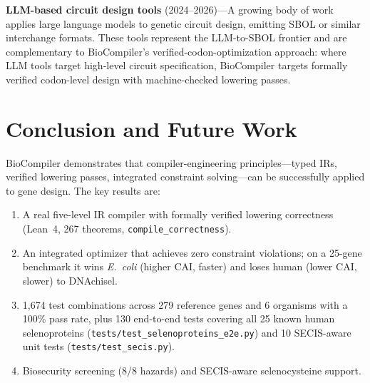\documentclass[11pt,a4paper]{article}
\theoremstyle{definition}
\begin{document}
\textbf{LLM-based circuit design tools} (2024--2026)---A growing body of work applies large language models to genetic circuit design, emitting SBOL or similar interchange formats. These tools represent the LLM-to-SBOL frontier and are complementary to BioCompiler's verified-codon-optimization approach: where LLM tools target high-level circuit specification, BioCompiler targets formally verified codon-level design with machine-checked lowering passes.

\section{Conclusion and Future Work}\label{sec:conclusion}

BioCompiler demonstrates that compiler-engineering principles---typed IRs, verified lowering passes, integrated constraint solving---can be successfully applied to gene design. The key results are:

\begin{enumerate}[leftmargin=*,itemsep=1pt]
\item A real five-level IR compiler with formally verified lowering correctness (Lean~4, 267 theorems, \texttt{compile\_correctness}).
\item An integrated optimizer that achieves zero constraint violations; on a 25-gene benchmark it wins \emph{E.~coli} (higher CAI, faster) and loses human (lower CAI, slower) to DNAchisel.
\item 1{,}674 test combinations across 279 reference genes and 6 organisms with a 100\% pass rate, plus 130 end-to-end tests covering all 25 known human selenoproteins (\texttt{tests/test\_selenoproteins\_e2e.py}) and 10 SECIS-aware unit tests (\texttt{tests/test\_secis.py}).
\item Biosecurity screening (8/8 hazards) and SECIS-aware selenocysteine support.
\end{enumerate}
\end{document}
